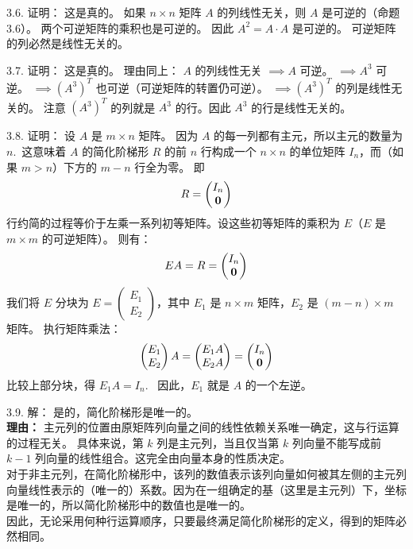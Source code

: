 \begin{exer}
3.6. 证明：
这是真的。
如果 $n \times n$ 矩阵 $A$ 的列线性无关，则 $A$ 是可逆的（命题 3.6）。
两个可逆矩阵的乘积也是可逆的。
因此 $A^2 = A \cdot A$ 是可逆的。
可逆矩阵的列必然是线性无关的。

3.7. 证明：
这是真的。
理由同上：
$A$ 的列线性无关 $\implies A$ 可逆。
$\implies A^3$ 可逆。
$\implies (A^3)^T$ 也可逆（可逆矩阵的转置仍可逆）。
$\implies (A^3)^T$ 的列是线性无关的。
注意 $(A^3)^T$ 的列就是 $A^3$ 的行。因此 $A^3$ 的行是线性无关的。

3.8. 证明：
设 $A$ 是 $m \times n$ 矩阵。
因为 $A$ 的每一列都有主元，所以主元的数量为 $n$.~这意味着 $A$ 的简化阶梯形 $R$ 的前 $n$ 行构成一个 $n \times n$ 的单位矩阵 $I_n$，而（如果 $m > n$）下方的 $m-n$ 行全为零。
即 $$ R = \begin{pmatrix} I_n \\ \mathbf{0} \end{pmatrix} $$
行约简的过程等价于左乘一系列初等矩阵。设这些初等矩阵的乘积为 $E$（$E$ 是 $m \times m$ 的可逆矩阵）。
则有：
$$ E A = R = \begin{pmatrix} I_n \\ \mathbf{0} \end{pmatrix} $$
我们将 $E$ 分块为 $E = \begin{pmatrix} E_1 \\ E_2 \end{pmatrix}$，其中 $E_1$ 是 $n \times m$ 矩阵，$E_2$ 是 $(m-n) \times m$ 矩阵。
执行矩阵乘法：
$$ \begin{pmatrix} E_1 \\ E_2 \end{pmatrix} A = \begin{pmatrix} E_1 A \\ E_2 A \end{pmatrix} = \begin{pmatrix} I_n \\ \mathbf{0} \end{pmatrix} $$
比较上部分块，得 $E_1 A = I_n$.~
因此，$E_1$ 就是 $A$ 的一个左逆。

3.9. 解：
是的，简化阶梯形是唯一的。
\\
\textbf{理由：}
主元列的位置由原矩阵列向量之间的线性依赖关系唯一确定，这与行运算的过程无关。
具体来说，第 $k$ 列是主元列，当且仅当第 $k$ 列向量不能写成前 $k-1$ 列向量的线性组合。这完全由向量本身的性质决定。
\\
对于非主元列，在简化阶梯形中，该列的数值表示该列向量如何被其左侧的主元列向量线性表示的（唯一的）系数。因为在一组确定的基（这里是主元列）下，坐标是唯一的，所以简化阶梯形中的数值也是唯一的。
\\
因此，无论采用何种行运算顺序，只要最终满足简化阶梯形的定义，得到的矩阵必然相同。


\end{exer}
